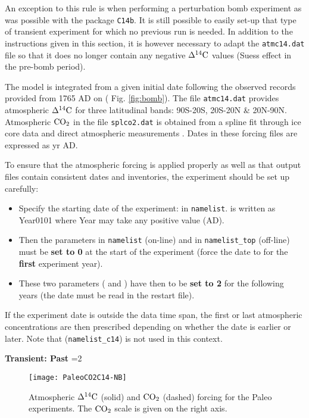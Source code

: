 \documentclass[../main/TOP_manual]{subfiles}
\begin{document}
An exception to this rule is when performing a perturbation bomb experiment as was possible with the package \texttt{C14b}.
It is still possible to easily set-up that type of transient experiment for which no previous run is needed.
In addition to the instructions given in this section, it is however necessary to adapt the \texttt{atmc14.dat} file so that it does no longer contain any negative $\Delta ^{14}\mathrm{C}$ values (Suess effect in the pre-bomb period).

The model  is integrated from a given initial date following the observed records provided from 1765 AD on ( Fig. \autoref{fig:bomb}).
The file \texttt{atmc14.dat}  \cite[][\& I.
Levin, personal comm.]{enting_1994} provides atmospheric $\Delta ^{14}\mathrm{C}$ for three latitudinal bands: 90S-20S,    20S-20N \&    20N-90N.
Atmospheric $\mathrm{CO_2}$ in the file \texttt{splco2.dat} is obtained from a spline fit through ice core data and direct atmospheric measurements \cite[][\& J.
Orr, personal comm.]{orr_2000}.
Dates in these forcing files are expressed as yr AD.

To ensure that the atmospheric forcing is applied properly as well as that output files contain consistent dates and inventories, the experiment should be set up carefully:

\begin{itemize}
\item Specify the starting date of the experiment:  in \texttt{namelist}.   is written as Year0101 where Year may take any positive value (AD).
\item Then the parameters  in  \texttt{namelist} (on-line) and  in \texttt{namelist\_top} (off-line)  must be \textbf{set to 0} at the start of the experiment (force the date to  for the \textbf{first} experiment year).
\item These two parameters ( and ) have then to be \textbf{set to 2} for the following years (the date must be read in the restart file).
\end{itemize}

If the experiment date is outside the data time span, the first or last atmospheric concentrations are then prescribed depending on whether the date is earlier or later.
	Note that  (\texttt{namelist\_c14}) is not used in this context.

%
\textbf{Transient: Past}
=2
%
\begin{figure}[!h]
\begin{center}
\texttt{[image: PaleoCO2C14-NB]}
\end{center}
\vspace{-4ex}
\caption{Atmospheric $\Delta ^{14}\mathrm{C}$ (solid) and $\mathrm{CO_2}$ (dashed)  forcing for the Paleo experiments.
The $\mathrm{CO_2}$ scale is given on the right axis.} \label{fig:paleo}
\end{figure}
\end{document}
